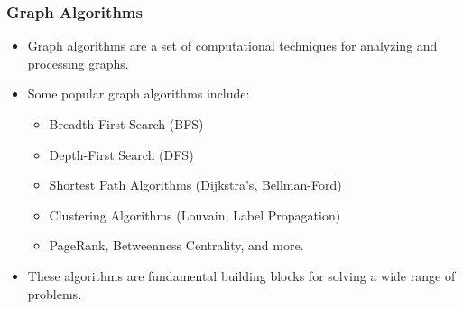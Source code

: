 







\begin{frame}[fragile]\frametitle{Graph Algorithms}
  \begin{itemize}
    \item Graph algorithms are a set of computational techniques for analyzing and processing graphs.
    \item Some popular graph algorithms include:
    \begin{itemize}
      \item Breadth-First Search (BFS)
      \item Depth-First Search (DFS)
      \item Shortest Path Algorithms (Dijkstra's, Bellman-Ford)
      \item Clustering Algorithms (Louvain, Label Propagation)
      \item PageRank, Betweenness Centrality, and more.
    \end{itemize}
    \item These algorithms are fundamental building blocks for solving a wide range of problems.
  \end{itemize}
\end{frame}



